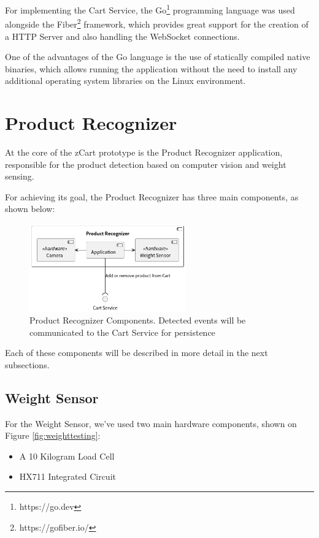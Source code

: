 \documentclass[openright]{normas-utf-tex} %
\begin{document}
For implementing the Cart Service, the Go\footnote{https://go.dev} programming
language was used alongside the Fiber\footnote{https://gofiber.io/} framework,
which provides great support for the creation of a HTTP Server and also
handling the WebSocket connections.

One of the advantages of the Go language is the use of statically compiled
native binaries, which allows running the application without the need to
install any additional operating system libraries on the Linux environment. 

\section{Product Recognizer}

At the core of the zCart prototype is the Product Recognizer application,
responsible for the product detection based on computer vision and weight
sensing.

For achieving its goal, the Product Recognizer has three main components, as shown below:
\begin{figure}[H]
	\centering
	\includegraphics[width=0.6\textwidth]{./images/diagrams/ProductRecognizer.png}
	\caption[Product Recognizer Components]{Product Recognizer Components. Detected events will be communicated to the Cart Service for persistence}
	\label{fig:dummy}
\end{figure}

Each of these components will be described in more detail in the next subsections.

\subsection{Weight Sensor}

For the Weight Sensor, we've used two main hardware components, shown on Figure \ref{fig:weighttesting}:
\begin{itemize}
    \item  A 10 Kilogram Load Cell
    \item HX711 Integrated Circuit
\end{itemize}
\end{document}
